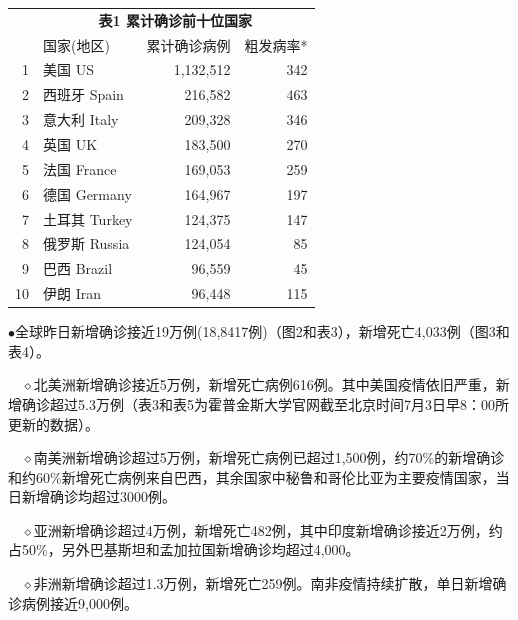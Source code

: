 \documentclass[
]{article}
\begin{document}
\begin{table}[H]
    \centering \begin{table}[H]
\centering\begingroup\fontsize{20}{22}\selectfont

\begin{tabular}{rlrr}
\toprule
\multicolumn{0}{c}{\textbf{ }} & \multicolumn{3}{c}{\textbf{表1 累计确诊前十位国家}} \\
  & 国家(地区) & 累计确诊病例 & 粗发病率*\\
\midrule
\rowcolor{gray!6}  1 & 美国 US & 1,132,512 & 342\\
2 & 西班牙 Spain & 216,582 & 463\\
\rowcolor{gray!6}  3 & 意大利 Italy & 209,328 & 346\\
4 & 英国 UK & 183,500 & 270\\
\rowcolor{gray!6}  5 & 法国 France & 169,053 & 259\\
6 & 德国 Germany & 164,967 & 197\\
\rowcolor{gray!6}  7 & 土耳其 Turkey & 124,375 & 147\\
8 & 俄罗斯 Russia & 124,054 & 85\\
\rowcolor{gray!6}  9 & 巴西 Brazil & 96,559 & 45\\
10 & 伊朗 Iran & 96,448 & 115\\
\bottomrule
\end{tabular}
\endgroup{}
\end{table} \end{table}

\(\bullet\)全球昨日新增确诊接近19万例(18,8417例)（图2和表3），新增死亡4,033例（图3和表4）。

\(\quad\)\(\diamond\)北美洲新增确诊接近5万例，新增死亡病例616例。其中美国疫情依旧严重，新增确诊超过5.3万例（表3和表5为霍普金斯大学官网截至北京时间7月3日早8：00所更新的数据）。

\(\quad\)\(\diamond\)南美洲新增确诊超过5万例，新增死亡病例已超过1,500例，约70\%的新增确诊和约60\%新增死亡病例来自巴西，其余国家中秘鲁和哥伦比亚为主要疫情国家，当日新增确诊均超过3000例。

\(\quad\)\(\diamond\)亚洲新增确诊超过4万例，新增死亡482例，其中印度新增确诊接近2万例，约占50\%，另外巴基斯坦和孟加拉国新增确诊均超过4,000。

\(\quad\)\(\diamond\)非洲新增确诊超过1.3万例，新增死亡259例。南非疫情持续扩散，单日新增确诊病例接近9,000例。
\end{document}

